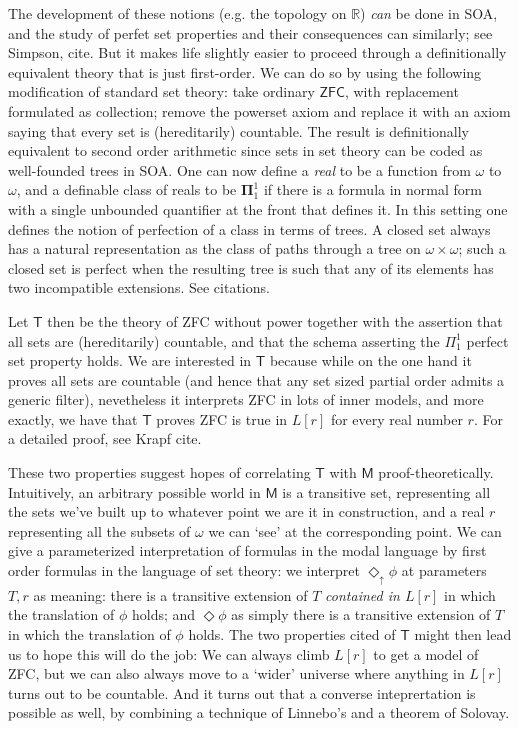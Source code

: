 \documentclass{article}
\theoremstyle{definition}
\newcommand{\du}{\Diamond_\uparrow}
\begin{document}
The development of these notions (e.g. the topology on $\mathbb{R}$) \emph{can} 
be done in SOA, and the study of perfet set properties and their consequences 
can similarly; see Simpson, cite. But it makes life slightly easier to proceed through 
a definitionally equivalent theory that is just first-order. We can do so 
by using the following modification of standard set theory: take ordinary $\mathsf{ZFC}$,
with replacement formulated as collection; remove the powerset axiom and replace it 
with an axiom saying that every set is (hereditarily) countable. The result is 
definitionally equivalent to second order arithmetic since sets in set theory 
can be coded as well-founded trees in SOA. One can now define a \emph{real} to be a 
function from $\omega$ to $\omega$, and a definable class of reals to be $\mathbf{\Pi}_1^1$
if there is a formula in normal form with a single unbounded quantifier at the front
that defines it. In this setting one defines the notion of perfection of a class 
in terms of trees. A closed set always has a natural representation as the class of 
paths through a tree on $\omega \times \omega$; such a closed set is perfect when 
the resulting tree is such that any of its elements has two incompatible extensions.
See citations.

Let $\mathsf{T}$ then be the theory of ZFC without power together with the assertion 
that all sets are (hereditarily) countable, and that the schema asserting the $\Pi_1^1$ 
perfect set property holds. We are interested in $\mathsf{T}$ because while on the one hand 
it proves all sets are countable (and hence that any set sized partial order 
admits a generic filter), nevetheless it interprets ZFC in lots of inner models, and 
more exactly, we have that $\mathsf{T}$ proves ZFC is true in $L[r]$ for every 
real number $r$. For a detailed proof, see Krapf cite. 

These two properties suggest hopes of correlating $\mathsf{T}$ with $\mathsf{M}$ proof-theoretically.
Intuitively, an arbitrary possible world in $\mathsf{M}$ is a transitive set, 
representing all the sets we've built up to whatever point we are it in construction,
and a real $r$ representing all the subsets of $\omega$ we can `see' at the corresponding 
point. 
We can give a parameterized interpretation of formulas in the modal language 
by first order formulas in the language of set theory: 
we interpret $\du \phi$ at parameters $T, r$ as meaning: 
there is a transitive extension of $T$ \emph{contained in $L[r]$} in which 
the translation of $\phi$ holds; and $\Diamond \phi$ as simply there is a transitive 
extension of $T$ in which the translation of $\phi$ holds. The two properties 
cited of $\mathsf{T}$ might then lead us to hope this will do the job: We can always 
climb $L[r]$ to get a model of ZFC, but we can also always move to a `wider' universe 
where anything in $L[r]$ turns out to be countable. And it turns out that 
a converse inteprertation is possible as well, by combining a technique of Linnebo's 
and a theorem of Solovay. 
\end{document}
